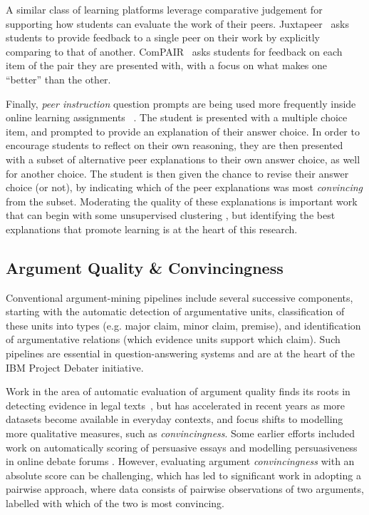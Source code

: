\documentclass[runningheads]{llncs}
\begin{document}
A similar class of learning platforms leverage comparative judgement for 
supporting how students can evaluate the work of their peers. 
Juxtapeer~\cite{cambre_juxtapeer:_2018} asks students to provide feedback to a 
single peer on their work by explicitly comparing to that of another.
ComPAIR~\cite{potter_compair:_2017} asks students for feedback on each item of 
the pair they are presented with, with a focus on what makes one ``better'' 
than the other.

Finally, \textit{peer instruction} question prompts are being used more 
frequently inside online learning 
assignments~\cite{univeristy_of_british_columbia_ubc/ubcpi_2019}
\cite{charles_harnessing_2019}.
The student is presented with a multiple choice item, and prompted to provide 
an explanation of their answer choice. 
In order to encourage students to reflect on their own reasoning, they are then 
presented with a subset of alternative peer explanations to their own answer 
choice, as well for another choice. The student is then given the chance to 
revise their answer choice (or not), by indicating which of the peer 
explanations was most \textit{convincing} from the subset.
Moderating the quality of these explanations is important work that can begin 
with some unsupervised clustering \cite{gagnon_filtering_2019}, but identifying 
the best explanations that promote learning is at the heart of this research.


\subsection{Argument Quality \& Convincingness}
Conventional argument-mining pipelines include several successive components, 
starting with the automatic detection of argumentative units, classification of 
these units into types (e.g. major claim, minor claim, premise), and 
identification of argumentative relations (which evidence units support which 
claim). 
Such pipelines are essential in question-answering systems 
\cite{lippi_argumentation_2016} and are at the heart of the IBM Project Debater 
initiative. 

Work in the area of automatic evaluation of argument quality finds its roots in 
detecting evidence in legal texts~\cite{moens_automatic_2007}, but has 
accelerated in recent years as more datasets become available in everyday 
contexts, and focus shifts to modelling more qualitative measures, such as 
\textit{convincingness}. 
Some earlier efforts included work on automatically 
scoring of persuasive essays \cite{persing_end--end_2016} and modelling 
persuasiveness in online debate forums \cite{tan_winning_2016}. 
However, evaluating argument \textit{convincingness} with an absolute score can 
be challenging, which has led to significant work in adopting a pairwise 
approach, where data consists of pairwise observations of two arguments, 
labelled with which of the two is most convincing.
\end{document}
